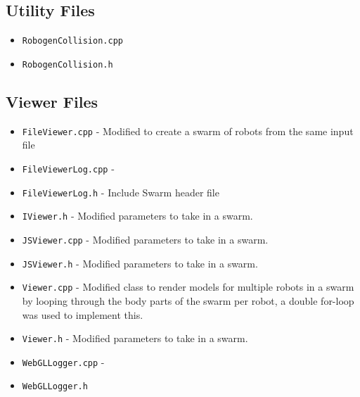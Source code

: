 \documentclass[11pt,a4paper]{article}
\begin{document}
\subsection{Utility Files}
\begin{itemize}
    \item \texttt{RobogenCollision.cpp}
    \item \texttt{RobogenCollision.h}
\end{itemize}

\subsection{Viewer Files}
\begin{itemize}
    \item \texttt{FileViewer.cpp} - Modified to create a swarm of robots from
        the same input file
    \item \texttt{FileViewerLog.cpp} -
    \item \texttt{FileViewerLog.h} - Include Swarm header file
    \item \texttt{IViewer.h} - Modified parameters to take in a swarm.
    \item \texttt{JSViewer.cpp} - Modified parameters to take in a swarm.
    \item \texttt{JSViewer.h} - Modified parameters to take in a swarm.
    \item \texttt{Viewer.cpp} - Modified class to render models for multiple
        robots in a swarm by looping through the body parts of the swarm per
        robot, a double for-loop was used to implement this.
    \item \texttt{Viewer.h} - Modified parameters to take in a swarm.
    \item \texttt{WebGLLogger.cpp} -
    \item \texttt{WebGLLogger.h}
\end{itemize}
\end{document}
